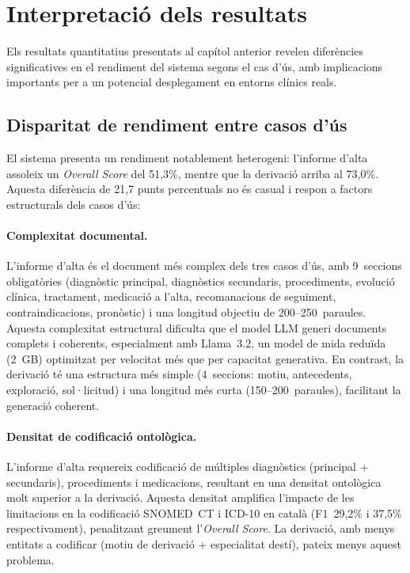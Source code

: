 \documentclass[CAT]{TFUOC}%
\begin{document}
\section{Interpretació dels resultats}

Els resultats quantitatius presentats al capítol anterior revelen diferències significatives en el rendiment del sistema segons el cas d'ús, amb implicacions importants per a un potencial desplegament en entorns clínics reals.

\subsection{Disparitat de rendiment entre casos d'ús}

El sistema presenta un rendiment notablement heterogeni: l'informe d'alta assoleix un \textit{Overall Score} del 51,3\%, mentre que la derivació arriba al 73,0\%. Aquesta diferència de 21,7 punts percentuals no és casual i respon a factors estructurals dels casos d'ús:

\paragraph{Complexitat documental.}
L'informe d'alta és el document més complex dels tres casos d'ús, amb 9~seccions obligatòries (diagnòstic principal, diagnòstics secundaris, procediments, evolució clínica, tractament, medicació a l'alta, recomanacions de seguiment, contraindicacions, pronòstic) i una longitud objectiu de 200--250~paraules. Aquesta complexitat estructural dificulta que el model LLM generi documents complets i coherents, especialment amb Llama~3.2, un model de mida reduïda (2~GB) optimitzat per velocitat més que per capacitat generativa. En contrast, la derivació té una estructura més simple (4~seccions: motiu, antecedents, exploració, sol·licitud) i una longitud més curta (150--200~paraules), facilitant la generació coherent.

\paragraph{Densitat de codificació ontològica.}
L'informe d'alta requereix codificació de múltiples diagnòstics (principal + secundaris), procediments i medicacions, resultant en una densitat ontològica molt superior a la derivació. Aquesta densitat amplifica l'impacte de les limitacions en la codificació SNOMED~CT i ICD-10 en català (F1~29,2\% i 37,5\% respectivament), penalitzant greument l'\textit{Overall Score}. La derivació, amb menys entitats a codificar (motiu de derivació + especialitat destí), pateix menys aquest problema.
\end{document}
